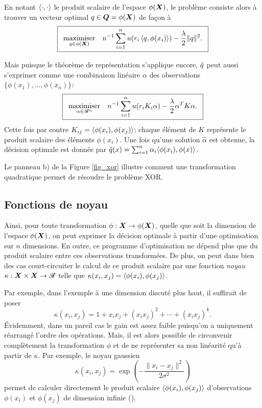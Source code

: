 En notant $\inp{\cdot,\cdot}$ le produit scalaire de l'espace $\phi(\X)$, le problème consiste alors
à trouver un vecteur optimal $q \in \Q = \phi(\X)$ de façon à
{\begin{equation}
    \boxed{
      \maximizeEquation[q\in\phi(\X)]{n^{-1}\sumi u(r_i\,\inp{q,\phi(x_i)}) - \frac{\lambda}{2}\|q\|^2.}}
  \end{equation}
  \vspace{-\baselineskip}}

Mais puisque le théorème de représentation s'applique encore, $\qh$ peut aussi s'exprimer
comme une combinaison linéaire $\alpha$ des observations $\{\phi(x_1) ,\ldots, \phi(x_n)\}$:
{\begin{equation}
\boxed{
  \maximizeEquation[\alpha \in \Re^n]{n^{-1}\sumi u(r_iK_i\alpha) - \frac{\lambda}{2}\alpha^TK\alpha.}}
\end{equation}
\vspace{-\baselineskip}}
Cette fois par contre $K_{ij} = \inp{\phi(x_i),\phi(x_j)}$; chaque élément de $K$ représente le
produit scalaire des éléments $\phi(x_i)$. Une fois qu'une solution $\hat\alpha$ est obtenue, la
décision optimale est donnée par $\qh(x) = \sumi \alpha_i\langle\phi(x_i),\phi(x)\rangle$. 

Le panneau b) de la Figure \ref{fig_xor} illustre comment une transformation quadratique
permet de résoudre le problème XOR.


\subsection{Fonctions de noyau}

Ainsi, pour toute transformation $\phi:\X\to\phi(\X)$, quelle que soit la dimension de l'espace
$\phi(\X)$, on peut exprimer la décision optimale à partir d'une optimisation sur $n$
dimensions. En outre, ce programme d'optimisation ne dépend plus que du produit scalaire
entre ces observations transformées. De plus, on peut dans bien des cas court-circuiter le
calcul de ce produit scalaire par une fonction \textit{noyau} $\kappa:\X\times\X \to \Re$ telle que
$\kappa(x_i,x_j) = \inp{\phi(x_i),\phi(x_j)}$.

Par exemple, dans l'exemple à une dimension discuté plus haut, il suffirait de poser
\begin{equation}
  \kappa(x_i,x_j) = 1 + x_ix_j + (x_ix_j)^2 + \cdots + (x_ix_j)^k.
\end{equation}
Évidemment, dans un pareil cas le gain est assez faible puisqu'on a uniquement réarrangé
l'ordre des opérations. Mais, il est alors possible de circonvenir complètement la
transformation $\phi$ et de ne représenter sa non linéarité qu'à partir de $\kappa$. Par exemple,
le noyau gaussien
\begin{equation}
  \kappa(x_i,x_j) = \exp\left(-\frac{\|x_i-x_j\|^2}{2\sigma^2}\right)
\end{equation}
permet de calculer directement le produit scalaire $\inp{\phi(x_i),\phi(x_j)}$ d'observations
$\phi(x_i)$ et $\phi(x_j)$ de dimension infinie
(\cite{mohri2012foundations,scholkopf2001learning}).

